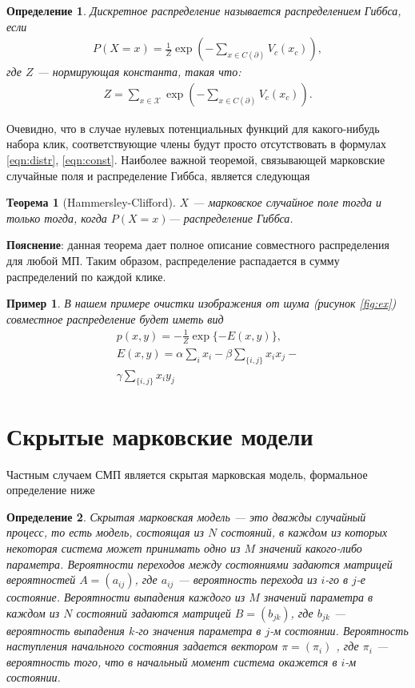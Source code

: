 \documentclass[12pt]{article}
\newtheorem{theorem}{Теорема}
\newtheorem{dfn}{Определение}
\newtheorem{example}{Пример}
\begin{document}
\begin{dfn}
Дискретное распределение называется распределением Гиббса, если
\begin{gather}
P(X=x) = \frac1Z \exp \left( - \sum\limits_{x\in C(\partial)} V_c(x_c) \right), 
\label{eqn:distr}
\end{gather}
где $Z$ --- нормирующая константа, такая что:
\begin{gather}
Z = \sum\limits_{x\in \mathcal{X}} \exp \left( - \sum\limits_{x\in C(\partial)} V_c(x_c)  \right).
\label{eqn:const}
\end{gather}
\end{dfn}
Очевидно, что в случае нулевых потенциальных функций для какого-нибудь набора клик, соответствующие члены будут просто отсутствовать в формулах \eqref{eqn:distr}, \eqref{eqn:const}.
Наиболее важной теоремой, связывающей марковские случайные
поля и распределение Гиббса, является следующая
\begin{theorem}[Hammersley-Clifford]
$X$ --- марковское случайное поле тогда и только тогда, когда $P(X = x)$--- распределение Гиббса.
\end{theorem}

\textbf{Пояснение}: данная теорема дает полное описание совместного распределения для любой МП. Таким образом, распределение распадается в сумму распределений по каждой клике.

\begin{example}
В нашем примере очистки изображения от шума (рисунок \ref{fig:ex}) совместное распределение будет иметь вид
\begin{gather*}
p(x, y) = -\frac{1}{Z} \exp\{ -E(x, y)\}, \\ 
E(x, y) = \alpha \sum\limits_i x_i - \beta \sum\limits_{ \{i, j \} } x_i x_j -   \\ \gamma \sum\limits_{ \{i, j \} } x_i y_j
\end{gather*}
\end{example}

\newpage
\section{Скрытые марковские модели}
Частным случаем СМП является скрытая марковская модель, формальное определение ниже
\begin{dfn}
Скрытая марковская модель --- это дважды случайный процесс, то есть модель, состоящая из $N$ состояний,
в каждом из которых некоторая система может принимать одно из
$M$ значений какого-либо параметра. Вероятности переходов между
состояниями задаются матрицей вероятностей $A = (a_{ij})$, где $a_{ij}$ — вероятность перехода из $i$-го в $j$-е состояние. Вероятности выпадения каждого из $M$ значений параметра в каждом из $N$ состояний
задаются матрицей $B = (b_{jk})$, где $b_{jk}$ — вероятность выпадения $k$-го
значения параметра в $j$-м состоянии. Вероятность наступления начального состояния задается вектором $\pi = (\pi_i)$ , где $\pi_i$ --- вероятность
того, что в начальный момент система окажется в $i$-м состоянии.
\end{dfn}
\end{document}
